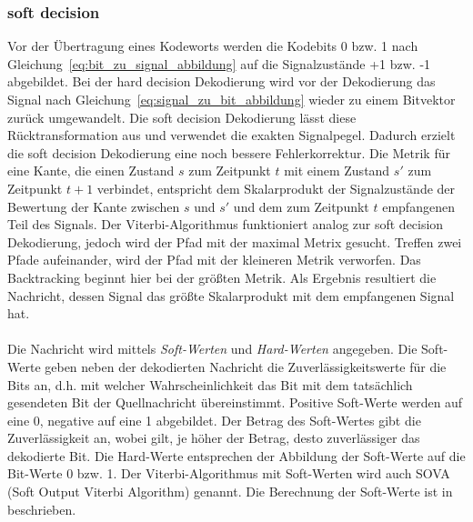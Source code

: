 \subsubsection{soft decision}
\label{kapitel:grundlagen_soft_decision}
Vor der Übertragung eines Kodeworts werden die Kodebits 0 bzw. 1 nach Gleichung~\eqref{eq:bit_zu_signal_abbildung} auf die Signalzustände +1 bzw. -1 abgebildet. Bei der hard decision Dekodierung wird vor der Dekodierung das Signal nach Gleichung~\eqref{eq:signal_zu_bit_abbildung} wieder zu einem Bitvektor zurück umgewandelt. Die soft decision Dekodierung lässt diese Rücktransformation aus und verwendet die exakten Signalpegel. Dadurch erzielt die soft decision Dekodierung eine noch bessere Fehlerkorrektur. Die Metrik für eine Kante, die einen Zustand $s$ zum Zeitpunkt $t$ mit einem Zustand $s'$ zum Zeitpunkt $t+1$ verbindet, entspricht dem Skalarprodukt der Signalzustände der Bewertung der Kante zwischen $s$ und $s'$ und dem zum Zeitpunkt $t$ empfangenen Teil des Signals. Der Viterbi-Algorithmus funktioniert analog zur soft decision Dekodierung, jedoch wird der Pfad mit der maximal Metrix gesucht. Treffen zwei Pfade aufeinander, wird der Pfad mit der kleineren Metrik verworfen. Das Backtracking beginnt hier bei der größten Metrik. Als Ergebnis resultiert die Nachricht, dessen Signal das größte Skalarprodukt mit dem empfangenen Signal hat.
\\
\\
Die Nachricht wird mittels \emph{Soft-Werten} und \emph{Hard-Werten} angegeben. Die Soft-Werte geben neben der dekodierten Nachricht die Zuverlässigkeitswerte für die Bits an, d.h. mit welcher Wahrscheinlichkeit das Bit mit dem tatsächlich gesendeten Bit der Quellnachricht übereinstimmt. Positive Soft-Werte werden auf eine 0, negative auf eine 1 abgebildet. Der Betrag des Soft-Wertes gibt die Zuverlässigkeit an, wobei gilt, je höher der Betrag, desto zuverlässiger das dekodierte Bit. Die Hard-Werte entsprechen der Abbildung der Soft-Werte auf die Bit-Werte 0 bzw. 1. Der Viterbi-Algorithmus mit Soft-Werten wird auch SOVA (Soft Output Viterbi Algorithm) genannt. Die Berechnung der Soft-Werte ist in \cite[S. 228 ff.]{schonfeld2012informations} beschrieben.

